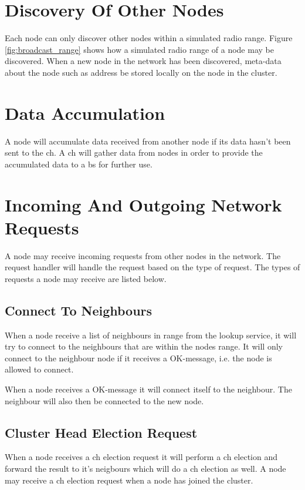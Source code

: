 \documentclass[USenglish]{uit-thesis}
\begin{document}


\section{Discovery Of Other Nodes} \label{sec:discON}
Each node can only discover other nodes within a simulated radio range. Figure \ref{fig:broadcast_range} shows how a simulated radio range of a node may be discovered. When a new node in the network has been discovered, meta-data about the node such as address be stored locally on the node in the cluster.


\section{Data Accumulation}
A node will accumulate data received from another node if its data hasn't been sent to the \gls{ch}. A \gls{ch} will gather data from nodes in order to provide the accumulated data to a \gls{bs} for further use.


\section{Incoming And Outgoing Network Requests}
A node may receive incoming requests from other nodes in the network. The request handler will handle the request based on the type of request. The types of requests a node may receive are listed below.

\subsection{Connect To Neighbours}
When a node receive a list of neighbours in range from the lookup service, it will try to connect to the neighbours that are within the nodes range. It will only connect to the neighbour node if it receives a OK-message, i.e. the node is allowed to connect.

When a node receives a OK-message it will connect itself to the neighbour. The neighbour will also then be connected to the new node.

\subsection{Cluster Head Election Request}
When a node receives a \gls{ch} election request it will perform a \gls{ch} election and forward the result to it's neigbours which will do a \gls{ch} election as well.
A node may receive a \gls{ch} election request when a node has joined the cluster.
\end{document}
